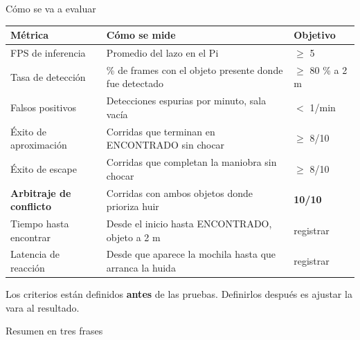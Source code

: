 \documentclass[aspectratio=169,10pt]{beamer}
\begin{document}
\begin{frame}{Cómo se va a evaluar}
  \scriptsize
  \begin{table}
    \begin{tabular}{@{}p{5.0cm}p{5.2cm}p{2.2cm}@{}}
      \toprule
      \textbf{Métrica} & \textbf{Cómo se mide} & \textbf{Objetivo} \\
      \midrule
      FPS de inferencia & Promedio del lazo en el Pi & $\geq$ 5 \\
      Tasa de detección & \% de frames con el objeto presente donde fue detectado & $\geq$ 80 \% a 2 m \\
      Falsos positivos & Detecciones espurias por minuto, sala vacía & $<$ 1/min \\
      Éxito de aproximación & Corridas que terminan en ENCONTRADO sin chocar & $\geq$ 8/10 \\
      Éxito de escape & Corridas que completan la maniobra sin chocar & $\geq$ 8/10 \\
      \textbf{Arbitraje de conflicto} & Corridas con ambos objetos donde prioriza huir & \textbf{10/10} \\
      Tiempo hasta encontrar & Desde el inicio hasta ENCONTRADO, objeto a 2 m & registrar \\
      Latencia de reacción & Desde que aparece la mochila hasta que arranca la huida & registrar \\
      \bottomrule
    \end{tabular}
  \end{table}

  \vspace{0.4em}
  {\centering\small
    Los criterios están definidos \textbf{antes} de las pruebas. Definirlos
    después es ajustar la vara al resultado.\par}
\end{frame}

\begin{frame}[standout]
  Resumen en tres frases
\end{frame}
\end{document}
